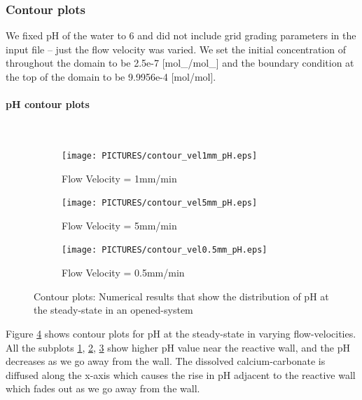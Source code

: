 \subsubsection*{Contour plots} \label{ssec:contour}
We fixed pH of the water to 6 and did not include grid grading parameters in the input file -- just the flow velocity was varied. We set the initial concentration of  throughout the domain to be 2.5e-7 [mol\_/mol\_] and the boundary condition at the top of the domain to be 9.9956e-4 [mol/mol].


\paragraph*{pH contour plots} \mbox{}\\
\begin{figure}[!h]
\centering
    \begin{subfigure}{.5\linewidth}
        \centering
        \texttt{[image: PICTURES/contour\_vel1mm\_pH.eps]}
        \caption{Flow Velocity = 1mm/min}
        \label{fig:pHSteady-state}       %
    \end{subfigure}%
    \hfill
    \begin{subfigure}{.5\linewidth}
        \centering
        \texttt{[image: PICTURES/contour\_vel5mm\_pH.eps]}
        \caption{Flow Velocity = 5mm/min}
        \label{fig:pHSteady-state5mm}       %
    \end{subfigure}%
    \hfill
    \begin{subfigure}{.5\linewidth}
        \centering
        \texttt{[image: PICTURES/contour\_vel0.5mm\_pH.eps]}
        \caption{Flow Velocity = 0.5mm/min}
        \label{fig:pHSteady-state0.5mm}       %
    \end{subfigure}%
    \caption{\DuMuX Contour plots: Numerical results that show the distribution of pH at the steady-state in an opened-system}
     \label{fig:contourpH}
\end{figure}

Figure \ref{fig:contourpH} shows contour plots for pH at the steady-state in varying flow-velocities. All the subplots \ref{fig:pHSteady-state}, \ref{fig:pHSteady-state5mm}, \ref{fig:pHSteady-state0.5mm} show higher pH value near the reactive wall, and the pH decreases as we go away from the wall. The dissolved calcium-carbonate is diffused along the x-axis which causes the rise in pH adjacent to the reactive wall which fades out as we go away from the wall.


